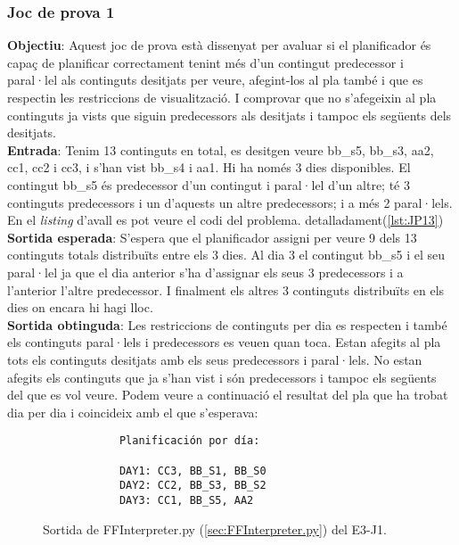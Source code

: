 \documentclass[a4paper]{article}
\begin{document}
	\subsubsection*{Joc de prova 1}
	
	\noindent \textbf{Objectiu}: Aquest joc de prova està dissenyat per avaluar si el planificador és capaç de planificar correctament tenint més d'un contingut predecessor i paral·lel als continguts desitjats per veure, afegint-los al pla també i que es respectin les restriccions de visualització. I comprovar que no s'afegeixin al pla continguts ja vists que siguin predecessors als desitjats i tampoc els següents dels desitjats.  \\
	
	\noindent \textbf{Entrada}: Tenim 13 continguts en total, es desitgen veure bb\_s5, bb\_s3, aa2, cc1, cc2 i cc3, i s'han vist bb\_s4 i aa1. Hi ha només 3 dies disponibles. El contingut bb\_s5 és predecessor d'un contingut i paral·lel d'un altre; té 3 continguts predecessors i un d'aquests un altre predecessors; i a més 2 paral·lels. En el \textit{listing} d'avall es pot veure el codi del problema.  detalladament(\ref{lst:JP13})\\
	
	\noindent \textbf{Sortida esperada}: S'espera que el planificador assigni per veure 9 dels 13 continguts totals distribuïts entre els 3 dies. Al dia 3 el contingut bb\_s5 i el seu paral·lel ja que el dia anterior s'ha d'assignar els seus 3 predecessors i a l'anterior l'altre predecessor. I finalment els altres 3 continguts distribuïts en els dies on encara hi hagi lloc. \\
	
	\noindent \textbf{Sortida obtinguda}: Les restriccions de continguts per dia es respecten i també els continguts paral·lels i predecessors es veuen quan toca.  Estan afegits al pla tots els continguts desitjats amb els seus predecessors i paral·lels. No estan afegits els continguts que ja s'han vist i són predecessors i tampoc els següents del que es vol veure. Podem veure a continuació el resultat del pla que ha trobat dia per dia i coincideix amb el que s'esperava:
	
	\begin{figure}[H]
		\centering
		\begin{verbatim}
			Planificación por día:
			
			DAY1: CC3, BB_S1, BB_S0
			DAY2: CC2, BB_S3, BB_S2
			DAY3: CC1, BB_S5, AA2
		\end{verbatim}
		\caption{Sortida de FFInterpreter.py (\ref{sec:FFInterpreter.py}) del E3-J1.}
	\end{figure}
	
\end{document}
